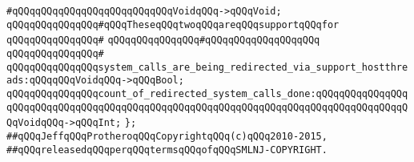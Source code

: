 \verb|#qQQqqQQqqQQqqQQqqQQqqQQqqQQqVoidqQQq->qQQqVoid;|\newline
\newline
\verb|qQQqqQQqqQQqqQQq#qQQqTheseqQQqtwoqQQqareqQQqsupportqQQqfor|\newline
\verb|qQQqqQQqqQQqqQQq#|\newline
\verb|qQQqqQQqqQQqqQQq#qQQqqQQqqQQqqQQqqQQq|\newline
\verb|qQQqqQQqqQQqqQQq#|\newline
\verb|qQQqqQQqqQQqqQQqsystem_calls_are_being_redirected_via_support_hostthreads:qQQqqQQqVoidqQQq->qQQqBool;|\newline
\verb|qQQqqQQqqQQqqQQqcount_of_redirected_system_calls_done:qQQqqQQqqQQqqQQqqQQqqQQqqQQqqQQqqQQqqQQqqQQqqQQqqQQqqQQqqQQqqQQqqQQqqQQqqQQqqQQqqQQqqQQqVoidqQQq->qQQqInt;|\newline
\verb|};|\newline
\newline
\newline
\newline
\verb|##qQQqJeffqQQqProtheroqQQqCopyrightqQQq(c)qQQq2010-2015,|\newline
\verb|##qQQqreleasedqQQqperqQQqtermsqQQqofqQQqSMLNJ-COPYRIGHT.|\newline

